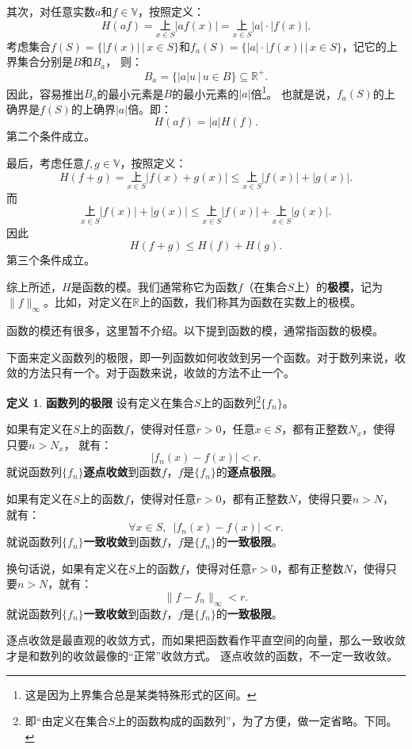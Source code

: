 \documentclass[12pt,UTF8]{ctexbook}
\theoremstyle{definition}
\newtheorem{df}{定义}[section]
\theoremstyle{plain}
\begin{document}
\begin{appendix}
其次，对任意实数$a$和$f\in\mathbb{V}$，按照定义：
$$ H(af) = \underset{x\in S}{\text{上}} |af(x)| = \underset{x\in S}{\text{上}} |a|\cdot |f(x)|. $$
考虑集合$f(S) = \{ |f(x)| \, | \, x\in S\}$和$f_a(S) = \{|a|\cdot |f(x)| \, | \, x\in S\}$，记它的上界集合分别是$B$和$B_a$，
则：
$$ B_a = \{|a| u \, | \, u \in B\} \subseteq \mathbb{R}^+. $$
因此，容易推出$B_a$的最小元素是$B$的最小元素的$|a|$倍\footnote{这是因为上界集合总是某类特殊形式的区间。}。
也就是说，$f_a(S)$的上确界是$f(S)$的上确界$|a|$倍。即：
$$ H(af) = |a| H(f). $$
第二个条件成立。

最后，考虑任意$f,g \in \mathbb{V}$，按照定义：
$$ H(f + g) = \underset{x\in S}{\text{上}} |f(x) + g(x)| \leqslant \underset{x\in S}{\text{上}} |f(x)| + |g(x)|. $$
而
$$ \underset{x\in S}{\text{上}} |f(x)| + |g(x)| \leqslant \underset{x\in S}{\text{上}} |f(x)| + \underset{x\in S}{\text{上}}|g(x)|.$$
因此
$$ H(f + g) \leqslant H(f) + H(g).$$
第三个条件成立。

综上所述，$H$是函数的模。我们通常称它为函数$f$（在集合$S$上）的\textbf{极模}，记为$\|f\|_{\infty}$。比如，对定义在$\mathbb{R}$上的函数，我们称其为函数在实数上的极模。

函数的模还有很多，这里暂不介绍。以下提到函数的模，通常指函数的极模。

下面来定义函数列的极限，即一列函数如何收敛到另一个函数。对于数列来说，收敛的方法只有一个。对于函数来说，收敛的方法不止一个。

\begin{df}{\textbf{函数列的极限}}
    设有定义在集合$S$上的函数列\footnote{即“由定义在集合$S$上的函数构成的函数列”，为了方便，做一定省略。下同。}$\{f_n\}$。
    
    如果有定义在$S$上的函数$f$，使得对任意$r>0$，任意$x\in S$，都有正整数$N_x$，使得只要$n>N_x$，
    就有：
    $$ |f_n(x) - f(x) | < r.$$
    就说函数列$\{f_n\}$\textbf{逐点收敛}到函数$f$，$f$是$\{f_n\}$的\textbf{逐点极限}。

    如果有定义在$S$上的函数$f$，使得对任意$r>0$，都有正整数$N$，使得只要$n>N$，
    就有：
    $$ \forall x\in S, \,\,\,|f_n(x) - f(x) | < r.$$
    就说函数列$\{f_n\}$\textbf{一致收敛}到函数$f$，$f$是$\{f_n\}$的\textbf{一致极限}。

    换句话说，如果有定义在$S$上的函数$f$，使得对任意$r>0$，都有正整数$N$，使得只要$n>N$，就有：
    $$ \| f - f_n \|_{\infty} < r.$$
    就说函数列$\{f_n\}$\textbf{一致收敛}到函数$f$，$f$是$\{f_n\}$的\textbf{一致极限}。
\end{df}

逐点收敛是最直观的收敛方式，而如果把函数看作平直空间的向量，那么一致收敛才是和数列的收敛最像的“正常”收敛方式。
逐点收敛的函数，不一定一致收敛。


\end{appendix}
\end{document}
